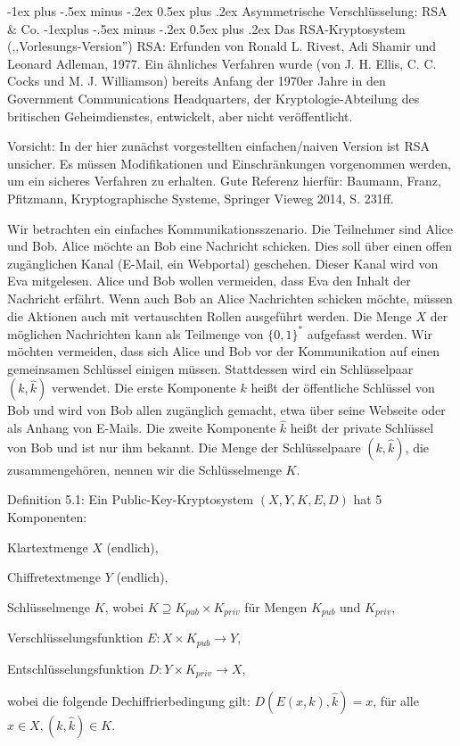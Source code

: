 \documentclass[a4paper]{article}
\makeatletter
\renewcommand{\section}{\@startsection{section}{1}{0mm}%
 {-1ex plus -.5ex minus -.2ex}%
 {0.5ex plus .2ex}%
 {\normalfont\large\bfseries}}
\renewcommand{\subsection}{\@startsection{subsection}{2}{0mm}%
 {-1explus -.5ex minus -.2ex}%
 {0.5ex plus .2ex}%
 {\normalfont\normalsize\bfseries}}
\makeatother
\begin{document}
\begin{multicols}{3}
        \section{Asymmetrische Verschlüsselung: RSA \& Co.}
        \subsection{Das RSA-Kryptosystem (,,Vorlesungs-Version'')}
        RSA: Erfunden von Ronald L. Rivest, Adi Shamir und Leonard Adleman, 1977. Ein ähnliches Verfahren wurde (von J. H. Ellis, C. C. Cocks und M. J. Williamson) bereits Anfang der 1970er Jahre in den Government Communications Headquarters, der Kryptologie-Abteilung des britischen Geheimdienstes, entwickelt, aber nicht veröffentlicht.

        Vorsicht: In der hier zunächst vorgestellten einfachen/naiven Version ist RSA unsicher. Es müssen Modifikationen und Einschränkungen vorgenommen werden, um ein
        sicheres Verfahren zu erhalten. Gute Referenz hierfür: Baumann, Franz, Pfitzmann, Kryptographische Systeme, Springer Vieweg 2014, S. 231ff.

        Wir betrachten ein einfaches Kommunikationsszenario. Die Teilnehmer sind Alice und Bob. Alice möchte an Bob eine Nachricht schicken. Dies soll über einen offen zugänglichen Kanal (E-Mail, ein Webportal) geschehen. Dieser Kanal wird von Eva mitgelesen. Alice und Bob wollen vermeiden, dass Eva den Inhalt der Nachricht erfährt. Wenn auch Bob an Alice Nachrichten schicken möchte, müssen die Aktionen auch mit vertauschten Rollen ausgeführt werden.
        Die Menge $X$ der möglichen Nachrichten kann als Teilmenge von $\{0,1\}^*$ aufgefasst werden. Wir möchten vermeiden, dass sich Alice und Bob vor der Kommunikation auf einen gemeinsamen Schlüssel einigen müssen. Stattdessen wird ein Schlüsselpaar $(k,\hat{k})$ verwendet. Die erste Komponente $k$ heißt der öffentliche Schlüssel von Bob und wird von Bob allen zugänglich gemacht, etwa über seine Webseite oder als Anhang von E-Mails. Die zweite Komponente $\hat{k}$ heißt der private Schlüssel von Bob und ist nur ihm bekannt. Die Menge der Schlüsselpaare $(k,\hat{k})$, die zusammengehören, nennen wir die Schlüsselmenge $K$.

        Definition 5.1: Ein Public-Key-Kryptosystem $(X,Y,K,E,D)$ hat 5 Komponenten:
        \begin{itemize*}
            \item Klartextmenge $X$ (endlich),
            \item Chiffretextmenge $Y$ (endlich),
            \item Schlüsselmenge $K$, wobei $K\supseteq K_{pub} \times K_{priv}$ für Mengen $K_{pub}$ und $K_{priv}$,
            \item Verschlüsselungsfunktion $E:X\times K_{pub} \rightarrow Y$,
            \item Entschlüsselungsfunktion $D:Y\times K_{priv} \rightarrow X$,
            \item wobei die folgende Dechiffrierbedingung gilt: $D(E(x,k), \hat{k}) =x$, für alle $x\in X,(k,\hat{k})\in K$.
        \end{itemize*}


\end{multicols}
\end{document}
